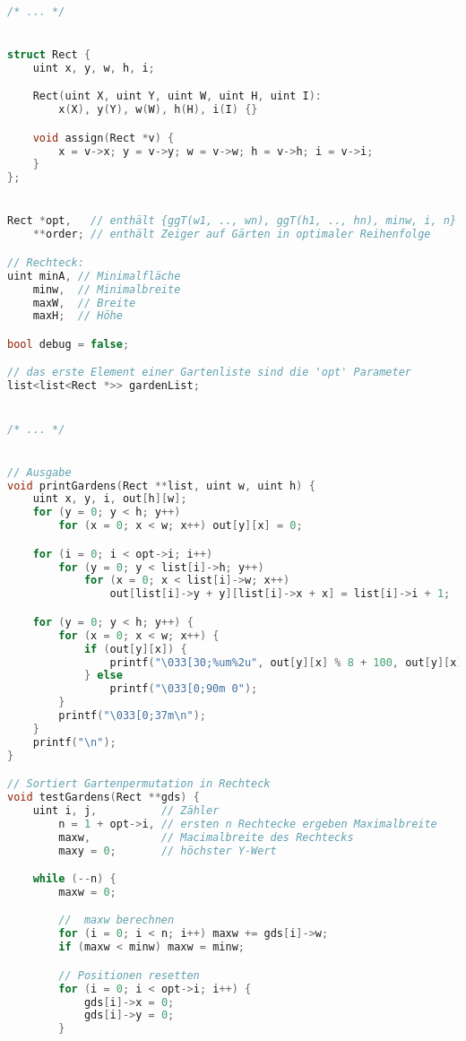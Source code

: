 \documentclass[a4paper,10pt,ngerman]{scrartcl}
\begin{document}
\begin{lstlisting}[language=C++]

/* ... */


struct Rect {
    uint x, y, w, h, i;

    Rect(uint X, uint Y, uint W, uint H, uint I):
        x(X), y(Y), w(W), h(H), i(I) {}

    void assign(Rect *v) {
        x = v->x; y = v->y; w = v->w; h = v->h; i = v->i;
    }
};


Rect *opt,   // enthält {ggT(w1, .., wn), ggT(h1, .., hn), minw, i, n} einer Gartenliste
    **order; // enthält Zeiger auf Gärten in optimaler Reihenfolge

// Rechteck:
uint minA, // Minimalfläche
    minw,  // Minimalbreite
    maxW,  // Breite
    maxH;  // Höhe

bool debug = false;

// das erste Element einer Gartenliste sind die 'opt' Parameter
list<list<Rect *>> gardenList;


/* ... */


// Ausgabe
void printGardens(Rect **list, uint w, uint h) {
    uint x, y, i, out[h][w];
    for (y = 0; y < h; y++)
        for (x = 0; x < w; x++) out[y][x] = 0;

    for (i = 0; i < opt->i; i++)
        for (y = 0; y < list[i]->h; y++)
            for (x = 0; x < list[i]->w; x++)
                out[list[i]->y + y][list[i]->x + x] = list[i]->i + 1;

    for (y = 0; y < h; y++) {
        for (x = 0; x < w; x++) {
            if (out[y][x]) {
                printf("\033[30;%um%2u", out[y][x] % 8 + 100, out[y][x]);
            } else
                printf("\033[0;90m 0");
        }
        printf("\033[0;37m\n");
    }
    printf("\n");
}

// Sortiert Gartenpermutation in Rechteck
void testGardens(Rect **gds) {
    uint i, j,          // Zähler
        n = 1 + opt->i, // ersten n Rechtecke ergeben Maximalbreite
        maxw,           // Macimalbreite des Rechtecks
        maxy = 0;       // höchster Y-Wert

    while (--n) {
        maxw = 0;

        //  maxw berechnen
        for (i = 0; i < n; i++) maxw += gds[i]->w;
        if (maxw < minw) maxw = minw;

        // Positionen resetten
        for (i = 0; i < opt->i; i++) {
            gds[i]->x = 0;
            gds[i]->y = 0;
        }


\end{lstlisting}
\end{document}
